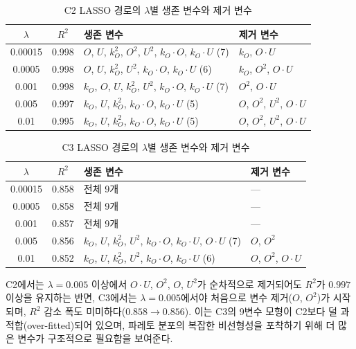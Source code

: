 \begin{table}[htbp]
\centering
\caption{C2 LASSO 경로의 $\lambda$별 생존 변수와 제거 변수}
\label{tab:app-c2-lasso-path}
\small
\begin{tabular}{c c l l}
\toprule
$\lambda$ & $R^2$ & 생존 변수 & 제거 변수 \\
\midrule
0.00015 & 0.998 & $O$, $U$, $k_O^2$, $O^2$, $U^2$, $k_O \cdot O$, $k_O \cdot U$ (7) & $k_O$, $O \cdot U$ \\
0.0005 & 0.998 & $O$, $U$, $k_O^2$, $U^2$, $k_O \cdot O$, $k_O \cdot U$ (6) & $k_O$, $O^2$, $O \cdot U$ \\
0.001 & 0.998 & $k_O$, $O$, $U$, $k_O^2$, $U^2$, $k_O \cdot O$, $k_O \cdot U$ (7) & $O^2$, $O \cdot U$ \\
0.005 & 0.997 & $k_O$, $U$, $k_O^2$, $k_O \cdot O$, $k_O \cdot U$ (5) & $O$, $O^2$, $U^2$, $O \cdot U$ \\
0.01 & 0.995 & $k_O$, $U$, $k_O^2$, $k_O \cdot O$, $k_O \cdot U$ (5) & $O$, $O^2$, $U^2$, $O \cdot U$ \\
\bottomrule
\end{tabular}
\end{table}

\begin{table}[htbp]
\centering
\caption{C3 LASSO 경로의 $\lambda$별 생존 변수와 제거 변수}
\label{tab:app-c3-lasso-path}
\small
\begin{tabular}{c c l l}
\toprule
$\lambda$ & $R^2$ & 생존 변수 & 제거 변수 \\
\midrule
0.00015 & 0.858 & 전체 9개 & --- \\
0.0005 & 0.858 & 전체 9개 & --- \\
0.001 & 0.857 & 전체 9개 & --- \\
0.005 & 0.856 & $k_O$, $U$, $k_O^2$, $U^2$, $k_O \cdot O$, $k_O \cdot U$, $O \cdot U$ (7) & $O$, $O^2$ \\
0.01 & 0.852 & $k_O$, $U$, $k_O^2$, $U^2$, $k_O \cdot O$, $k_O \cdot U$ (6) & $O$, $O^2$, $O \cdot U$ \\
\bottomrule
\end{tabular}
\end{table}

C2에서는 $\lambda = 0.005$ 이상에서 $O \cdot U$, $O^2$, $O$, $U^2$가 순차적으로
제거되어도 $R^2$가 $0.997$ 이상을 유지하는 반면,
C3에서는 $\lambda = 0.005$에서야 처음으로 변수 제거($O$, $O^2$)가 시작되며,
$R^2$ 감소 폭도 미미하다($0.858 \to 0.856$).
이는 C3의 9변수 모형이 C2보다 덜 과적합(over-fitted)되어 있으며,
파레토 분포의 복잡한 비선형성을 포착하기 위해 더 많은 변수가 구조적으로
필요함을 보여준다.


